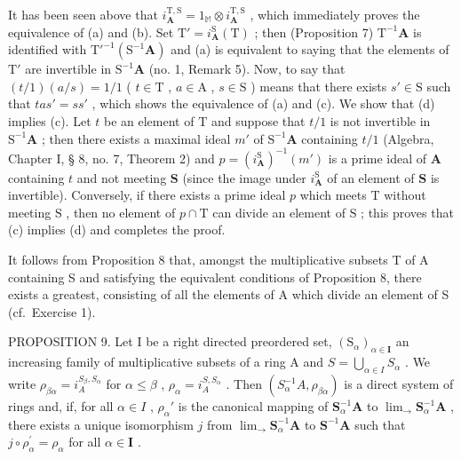 It has been seen above that \(i_{\mathbf{A}}^{\mathrm{T},\mathrm{S}} = 1_{\mathbb{M}} \otimes i_{\mathbf{A}}^{\mathrm{T},\mathrm{S}}\) , which immediately proves the equivalence of (a) and (b). Set \(\mathrm{T}' = i_{\mathbf{A}}^{\mathrm{S}}(\mathrm{T})\) ; then (Proposition 7) \(\mathrm{T}^{-1}\mathbf{A}\) is identified with \(\mathrm{T}'^{-1}(\mathrm{S}^{-1}\mathbf{A})\) and (a) is equivalent to saying that the elements of \(\mathrm{T}'\) are invertible in \(\mathrm{S}^{-1}\mathbf{A}\) (no. 1, Remark 5). Now, to say that \((t/1)(a/s) = 1/1\) ( \(t \in \mathrm{T}\) , \(a \in \mathrm{A}\) , \(s \in \mathrm{S}\) ) means that there exists \(s' \in \mathrm{S}\) such that \(tas' = ss'\) , which shows the equivalence of (a) and (c). We show that (d) implies (c). Let \(t\) be an element of \(\mathrm{T}\) and suppose that \(t/1\) is not invertible in \(\mathrm{S}^{-1}\mathbf{A}\) ; then there exists a maximal ideal \(m'\) of \(\mathrm{S}^{-1}\mathbf{A}\) containing \(t/1\) (Algebra, Chapter I, § 8, no. 7, Theorem 2) and \(p = (i_{\mathbf{A}}^{\mathrm{S}})^{-1}(m')\) is a prime ideal of \(\mathbf{A}\) containing \(t\) and not meeting \(\mathbf{S}\) (since the image under \(i_{\mathbf{A}}^{\mathrm{S}}\) of an element of \(\mathbf{S}\) is invertible). Conversely, if there exists a prime ideal \(p\) which meets \(\mathrm{T}\) without meeting \(\mathrm{S}\) , then no element of \(p \cap \mathrm{T}\) can divide an element of \(\mathrm{S}\) ; this proves that (c) implies (d) and completes the proof.

It follows from Proposition 8 that, amongst the multiplicative subsets T of A containing S and satisfying the equivalent conditions of Proposition 8, there exists a greatest, consisting of all the elements of A which divide an element of S (cf.~Exercise 1).

PROPOSITION 9. Let I be a right directed preordered set, \((\mathrm{S}_{\alpha})_{\alpha \in \mathbf{I}}\) an increasing family of multiplicative subsets of a ring A and \(S = \bigcup_{\alpha \in I} S_{\alpha}\) . We write \(\rho_{\beta \alpha} = i_{A}^{S_{\beta}, S_{\alpha}}\) for \(\alpha \leqslant \beta\) , \(\rho_{\alpha} = i_{A}^{S, S_{\alpha}}\) . Then \((S_{\alpha}^{-1}A, \rho_{\beta \alpha})\) is a direct system of rings and, if, for all \(\alpha \in I\) , \(\rho_{\alpha}'\) is the canonical mapping of \(\mathbf{S}_{\alpha}^{-1}\mathbf{A}\) to \(\lim_{\longrightarrow}\mathbf{S}_{\alpha}^{-1}\mathbf{A}\) , there exists a unique isomorphism \(j\) from \(\lim_{\longrightarrow}\mathbf{S}_{\alpha}^{-1}\mathbf{A}\) to \(\mathbf{S}^{-1}\mathbf{A}\) such that \(j\circ \rho_{\alpha}^{\prime} = \rho_{\alpha}\) for all \(\alpha \in \mathbf{I}\) .

